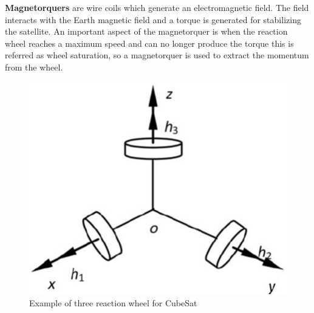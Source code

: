 \textbf{Magnetorquers} are wire coils which generate an electromagnetic field. The field interacts with the Earth magnetic field and a torque is generated for stabilizing the satellite. An important aspect of the magnetorquer is when the reaction wheel reaches a maximum speed and can no longer produce the torque this is referred as wheel saturation, so a magnetorquer is used to extract the momentum from the wheel.
%
\begin{table}[H]
	\begin{minipage}[b]{0.49\linewidth}
		\centering
		\begin{figure}[H]
			\centering
			\includegraphics[width=0.9\linewidth]{figures/RW}
			\caption{Example of three reaction wheel for CubeSat}
			\label{fig:MW}
		\end{figure}
	\end{minipage}\hfill
	\begin{minipage}[b]{0.49\linewidth}
		\centering
		\begin{figure}[H]
			\centering

\end{figure}
\end{minipage}
\end{table}
